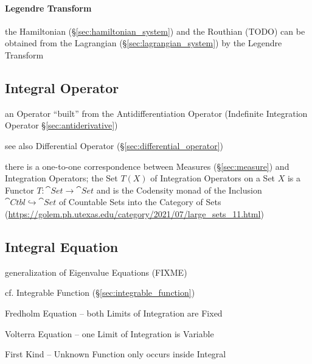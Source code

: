 {\paragraph{Legendre Transform}\label{sec:legendre_transform}\hfill

the Hamiltonian (\S\ref{sec:hamiltonian_system}) and the Routhian (TODO) can be
obtained from the Lagrangian (\S\ref{sec:lagrangian_system}) by the Legendre
Transform



\subsection{Integral Operator}\label{sec:integral_operator}

an Operator ``built'' from the Antidifferentiation Operator (Indefinite
Integration Operator \S\ref{sec:antiderivative})

\fist see also Differential Operator (\S\ref{sec:differential_operator})

there is a one-to-one correspondence between Measures (\S\ref{sec:measure}) and
Integration Operators; the Set $T(X)$ of Integration Operators on a Set $X$ is a
Functor $T : \cat{Set} \to \cat{Set}$ and is the Codensity monad of the
Inclusion $\cat{Ctbl} \hookrightarrow \cat{Set}$ of Countable Sets into the
Category of Sets
(\url{https://golem.ph.utexas.edu/category/2021/07/large_sets_11.html})



\subsection{Integral Equation}\label{sec:integral_equation}

generalization of Eigenvalue Equations (FIXME)

cf. Integrable Function (\S\ref{sec:integrable_function})

Fredholm Equation -- both Limits of Integration are Fixed

Volterra Equation -- one Limit of Integration is Variable

First Kind -- Unknown Function only occurs inside Integral

}
